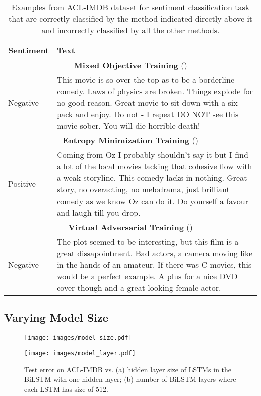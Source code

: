 \documentclass[letterpaper]{article}
\begin{document}
\begin{table*}[t]
\begin{minipage}{\linewidth}
\small
\centering
\begin{tabularx}{\linewidth}{@{} l X @{}}
\toprule
\textbf{Sentiment} & \textbf{Text} \\
\midrule
\multicolumn{2}{c}{\textbf{Mixed Objective Training} ()} \\
\midrule
Negative & This movie is so over-the-top as to be a borderline comedy. Laws of physics are broken. Things explode for no good reason. Great movie to sit down with a six-pack and enjoy. Do not - I repeat DO NOT see this movie sober. You will die horrible death!\\
\midrule
\multicolumn{2}{c}{\textbf{Entropy Minimization Training} ()} \\
\midrule
Positive & Coming from Oz I probably shouldn't say it but I find a lot of the local movies lacking that cohesive flow with a weak storyline. This comedy lacks in nothing. Great story, no overacting, no melodrama, just brilliant comedy as we know Oz can do it. Do yourself a favour and laugh till you drop.\\
\midrule
\multicolumn{2}{c}{\textbf{Virtual Adversarial Training} ()} \\
\midrule
Negative & The plot seemed to be interesting, but this film is a great dissapointment. Bad actors, a camera moving like in the hands of an amateur. If there was C-movies, this would be a perfect example. A plus for a nice DVD cover though and a great looking female actor.\\
\bottomrule
\end{tabularx}
\caption{Examples from ACL-IMDB dataset for sentiment classification task that are correctly classified by the method indicated directly above it and incorrectly classified by all the other methods.}
\label{table:examples}
\end{minipage}
\end{table*}

\subsection{Varying Model Size}
\begin{figure}[!htp]
\begin{minipage}{0.5\linewidth}
\centering
\texttt{[image: images/model\_size.pdf]}
\label{fig:hidden_size}
\end{minipage}\begin{minipage}{0.5\linewidth}
\centering
\texttt{[image: images/model\_layer.pdf]}
\label{fig:layers}
\end{minipage}
\caption{Test error on ACL-IMDB vs. (a) hidden layer size of LSTMs in the BiLSTM with one-hidden layer; (b) number of BiLSTM layers where each LSTM has size of 512.}
\label{fig:model_size}
\end{figure}
\end{document}
